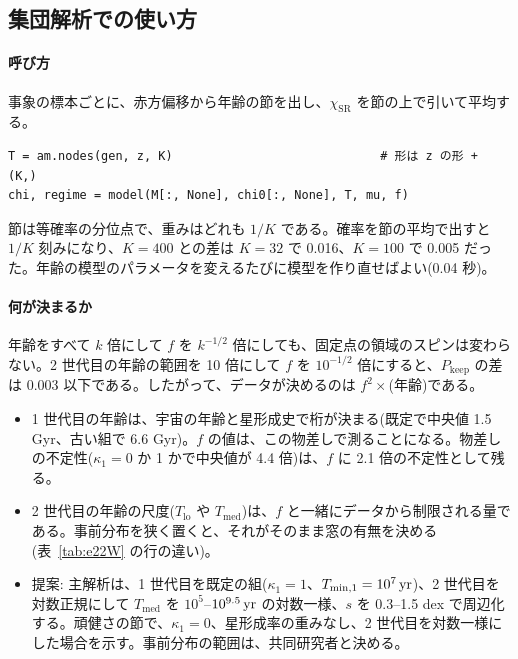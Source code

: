 \subsection{集団解析での使い方}

\paragraph{呼び方}
事象の標本ごとに、赤方偏移から年齢の節を出し、$\chi_\mathrm{SR}$ を節の上で引いて平均する。
\begin{verbatim}
T = am.nodes(gen, z, K)                             # 形は z の形 + (K,)
chi, regime = model(M[:, None], chi0[:, None], T, mu, f)
\end{verbatim}
節は等確率の分位点で、重みはどれも $1/K$ である。確率を節の平均で出すと $1/K$ 刻みになり、$K=400$ との差は $K=32$ で 0.016、$K=100$ で 0.005 だった。年齢の模型のパラメータを変えるたびに模型を作り直せばよい(0.04 秒)。

\paragraph{何が決まるか}
年齢をすべて $k$ 倍にして $f$ を $k^{-1/2}$ 倍にしても、固定点の領域のスピンは変わらない。2 世代目の年齢の範囲を 10 倍にして $f$ を $10^{-1/2}$ 倍にすると、$P_\mathrm{keep}$ の差は 0.003 以下である。したがって、データが決めるのは $f^2\times$(年齢)である。
\begin{itemize}
\item 1 世代目の年齢は、宇宙の年齢と星形成史で桁が決まる(既定で中央値 1.5 Gyr、古い組で 6.6 Gyr)。$f$ の値は、この物差しで測ることになる。物差しの不定性($\kappa_1=0$ か 1 かで中央値が 4.4 倍)は、$f$ に 2.1 倍の不定性として残る。
\item 2 世代目の年齢の尺度($T_\mathrm{lo}$ や $T_\mathrm{med}$)は、$f$ と一緒にデータから制限される量である。事前分布を狭く置くと、それがそのまま窓の有無を決める(表~\ref{tab:e22W} の行の違い)。
\item 提案: 主解析は、1 世代目を既定の組($\kappa_1=1$、$T_\mathrm{min,1}=10^7\,\mathrm{yr}$)、2 世代目を対数正規にして $T_\mathrm{med}$ を $10^5$--$10^{9.5}\,\mathrm{yr}$ の対数一様、$s$ を 0.3--1.5 dex で周辺化する。頑健さの節で、$\kappa_1=0$、星形成率の重みなし、2 世代目を対数一様にした場合を示す。事前分布の範囲は、共同研究者と決める。
\end{itemize}


